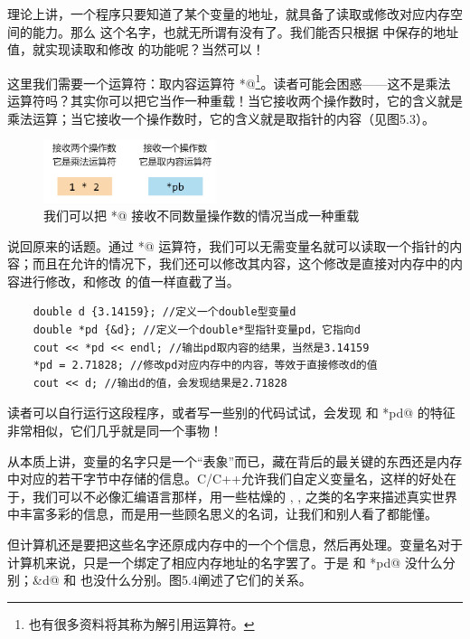 理论上讲，一个程序只要知道了某个变量的地址，就具备了读取或修改对应内存空间的能力。那么 \lstinline@d@ 这个名字，也就无所谓有没有了。我们能否只根据 \lstinline@pd@ 中保存的地址值，就实现读取和修改 \lstinline@d@ 的功能呢？当然可以！\par
这里我们需要一个运算符：取内容运算符 \lstinline@*@\footnote{也有很多资料将其称为解引用运算符。}。读者可能会困惑——这不是乘法运算符吗？其实你可以把它当作一种重载！当它接收两个操作数时，它的含义就是乘法运算；当它接收一个操作数时，它的含义就是取指针的内容（见图5.3）。\par
\begin{figure}[htbp]
    \centering
    \includegraphics[width=0.45\textwidth]{../images/generalized_parts/05_operator_dereference_or_multiplication.drawio.png}
    \caption{我们可以把 \lstinline@*@ 接收不同数量操作数的情况当成一种重载}
\end{figure}
说回原来的话题。通过 \lstinline@*@ 运算符，我们可以无需变量名就可以读取一个指针的内容；而且在允许的情况下，我们还可以修改其内容，这个修改是直接对内存中的内容进行修改，和修改 \lstinline@d@ 的值一样直截了当。\par
\begin{lstlisting}
    double d {3.14159}; //定义一个double型变量d
    double *pd {&d}; //定义一个double*型指针变量pd，它指向d
    cout << *pd << endl; //输出pd取内容的结果，当然是3.14159
    *pd = 2.71828; //修改pd对应内存中的内容，等效于直接修改d的值
    cout << d; //输出d的值，会发现结果是2.71828
\end{lstlisting}
读者可以自行运行这段程序，或者写一些别的代码试试，会发现 \lstinline@d@ 和 \lstinline@*pd@ 的特征非常相似，它们几乎就是同一个事物！\par
从本质上讲，变量的名字只是一个``表象''而已，藏在背后的最关键的东西还是内存中对应的若干字节中存储的信息。C/C++允许我们自定义变量名，这样的好处在于，我们可以不必像汇编语言那样，用一些枯燥的 \lstinline@rip@, \lstinline@rsp@, \lstinline@eax@ 之类的名字来描述真实世界中丰富多彩的信息，而是用一些顾名思义的名词，让我们和别人看了都能懂。\par
但计算机还是要把这些名字还原成内存中的一个个信息，然后再处理。变量名对于计算机来说，只是一个绑定了相应内存地址的名字罢了。于是 \lstinline@d@ 和 \lstinline@*pd@ 没什么分别；\lstinline@&d@ 和 \lstinline@pd@ 也没什么分别。图5.4阐述了它们的关系。\par
